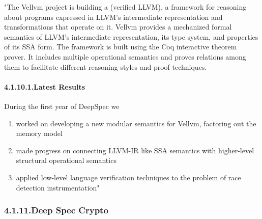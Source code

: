 \documentclass[12pt,twoside]{article}
\begin{document}
\noindent{}"The Vellvm project is building a (verified LLVM), a framework for
reasoning about programs expressed in LLVM's intermediate
representation and transformations that operate on it. Vellvm provides
a mechanized formal semantics of LLVM's intermediate representation,
its type system, and properties of its SSA form. The framework is
built using the Coq interactive theorem prover. It includes multiple
operational semantics and proves relations among them to facilitate
different reasoning styles and proof techniques.%

\paragraph{4.1.10.1.\hspace*{0.5em}Latest Results}%

\noindent{}During the first year of DeepSpec we%

\begin{enumerate}%

\item{}
worked on developing a new modular semantics for Vellvm, factoring out the memory model%

\item{}
made progress on connecting LLVM-IR like SSA semantics with higher-level structural operational semantics%

\item{}
applied low-level language verification techniques to the problem of race detection instrumentation"%
\end{enumerate}%

\subsubsection{4.1.11.\hspace*{0.5em}Deep Spec Crypto}%
\end{document}
